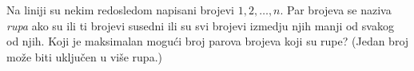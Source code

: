 \problem{}
Na liniji su nekim redosledom napisani brojevi $1, 2, \ldots, n$.
Par brojeva se naziva \emph{rupa} ako su ili ti brojevi susedni ili su svi brojevi
izmedju njih manji od svakog od njih.
Koji je maksimalan mogući broj parova brojeva koji su rupe?
(Jedan broj može biti uključen u više rupa.)
\solution
\endproblem
